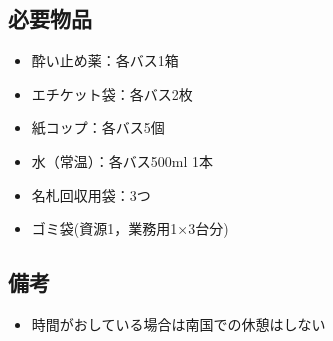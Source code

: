 \newpage

\subsection{必要物品}
\begin{itemize}
\item 酔い止め薬：各バス1箱
\item エチケット袋：各バス2枚
\item 紙コップ：各バス5個
\item 水（常温）：各バス500ml 1本
\item 名札回収用袋：3つ
\item ゴミ袋(資源1，業務用1×3台分)
\end{itemize}


\subsection{備考}
\begin{itemize}
\item 時間がおしている場合は南国での休憩はしない
\end{itemize}

%
